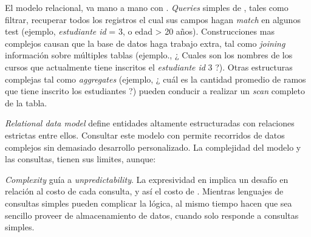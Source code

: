 El modelo relacional, va mano a mano con . \textit{Queries} simples de , tales como filtrar, recuperar todos los registros el cual sus campos hagan \textit{match} en algunos test (ejemplo, \textit{estudiante id} = 3, o edad > 20 años). Construcciones mas complejos causan que la base de datos haga trabajo extra, tal como \textit{joining} información sobre múltiples tablas (ejemplo., ¿ Cuales son los nombres de los cursos que actualmente tiene inscritos el \textit{estudiante id} 3 ?). Otras estructuras complejas tal como \textit{aggregates} (ejemplo, ¿ cuál es la cantidad promedio de ramos que tiene inscrito los estudiantes
?) pueden conducir a realizar un \textit{scan} completo de la tabla.


\textit{Relational data model} define entidades altamente estructuradas con relaciones estrictas entre ellos. Consultar este modelo con  permite recorridos de datos complejos sin demasiado desarrollo personalizado. La complejidad del modelo y las consultas, tienen sus limites, aunque:


\textit{Complexity} guía a \textit{unpredictability}. La expresividad en  implica un desafío en relación al costo de cada consulta, y así el costo de \textit{}. Mientras lenguajes de consultas simples pueden complicar la lógica, al mismo tiempo hacen que sea sencillo proveer de almacenamiento de datos, cuando solo responde a consultas simples.

